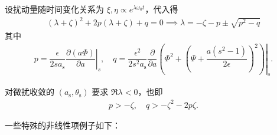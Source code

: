 设扰动量随时间变化关系为 \(\xi, \eta \propto e^{\lambda \omega_0 t}\)，代入得
\begin{align*}
	(\lambda + \zeta)^2 + 2 p (\lambda + \zeta) + q = 0 \implies \lambda = -\zeta - p \pm \sqrt{p^2 - q}
\end{align*}
其中
\begin{align*}
	p = \left. \dfrac{\epsilon}{2 s a_{\mathrm{s}}} \dfrac{\partial (a \Phi)}{\partial a} \right|_s,\quad
	q = \dfrac{\epsilon^2}{2 s^2 a_{\mathrm{s}}} \left. \dfrac{\partial}{\partial a} \left( \Phi^2 + \left( \Psi + \dfrac{a (s^2 - 1)}{2 \epsilon} \right)^2 \right) \right|_s.
\end{align*}

对微扰收敛的 \((a_{\mathrm{s}}, \theta_{\mathrm{s}})\) 要求 \(\Re\lambda< 0\)，也即
\begin{align*}
	p > -\zeta, \quad q > -\zeta^2 - 2 p \zeta.
\end{align*}

一些特殊的非线性项例子如下：

